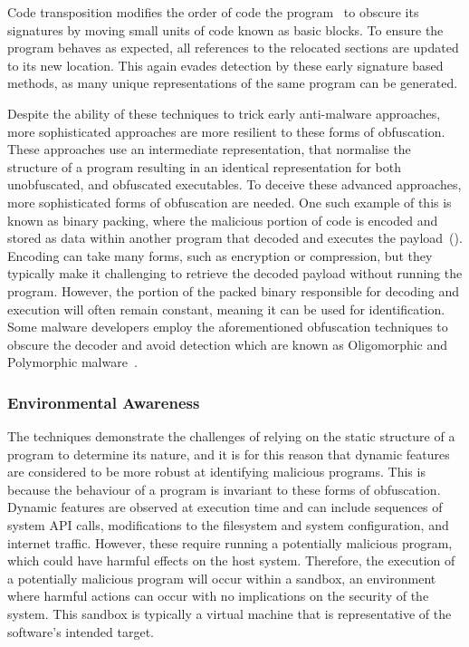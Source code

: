 \documentclass[main.tex]{subfiles}
\begin{document}
Code transposition modifies the order of code the program~\citep{christodorescuStaticAnalysisExecutables2004} to obscure its signatures by moving small units of code known as basic blocks. To ensure the program behaves as expected, all references to the relocated sections are updated to its new location. This again evades detection by these early signature based methods, as many unique representations of the same program can be generated. 

Despite the ability of these techniques to trick early anti-malware approaches, more sophisticated approaches are more resilient to these forms of obfuscation. These approaches use an intermediate representation, that normalise the structure of a program resulting in an identical representation for both unobfuscated, and obfuscated executables. To deceive these advanced approaches, more sophisticated forms of obfuscation are needed. One such example of this is known as binary packing, where the malicious portion of code is encoded and stored as data within another program that decoded and executes the payload~(). Encoding can take many forms, such as encryption or compression, but they typically make it challenging to retrieve the decoded payload without running the program. However, the portion of the packed binary responsible for decoding and execution will often remain constant, meaning it can be used for identification. Some malware developers employ the aforementioned obfuscation techniques to obscure the decoder and avoid detection which are known as Oligomorphic and Polymorphic malware~\citep{youMalwareObfuscationTechniques2010}. 

\subsubsection{Environmental Awareness}


The techniques demonstrate the challenges of relying on the static structure of a program to determine its nature, and it is for this reason that dynamic features are considered to be more robust at identifying malicious programs. This is because the behaviour of a program is invariant to these forms of obfuscation. Dynamic features are observed at execution time and can include sequences of system API calls, modifications to the filesystem and system configuration, and internet traffic. However, these require running a potentially malicious program, which could have harmful effects on the host system. Therefore, the execution of a potentially malicious program will occur within a sandbox, an environment where harmful actions can occur with no implications on the security of the system. This sandbox is typically a virtual machine that is representative of the software's intended target. 
\end{document}
